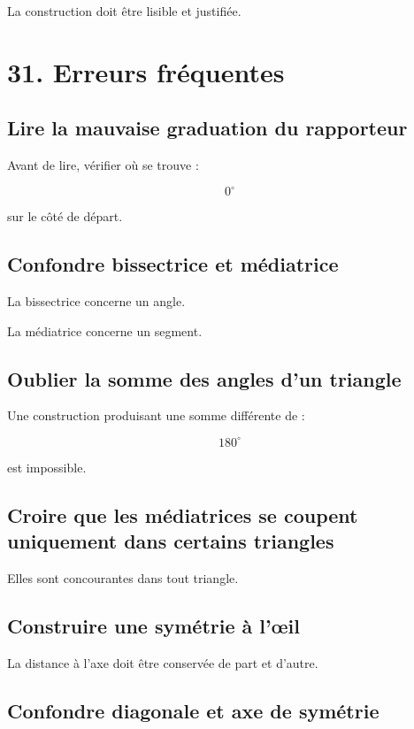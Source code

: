 La construction doit être lisible et justifiée.

\section{31. Erreurs fréquentes}

\subsection{Lire la mauvaise graduation du rapporteur}

Avant de lire, vérifier où se trouve :

\[
0^\circ
\]

sur le côté de départ.

\subsection{Confondre bissectrice et médiatrice}

La bissectrice concerne un angle.

La médiatrice concerne un segment.

\subsection{Oublier la somme des angles d’un triangle}

Une construction produisant une somme différente de :

\[
180^\circ
\]

est impossible.

\subsection{Croire que les médiatrices se coupent uniquement dans certains triangles}

Elles sont concourantes dans tout triangle.

\subsection{Construire une symétrie à l’œil}

La distance à l’axe doit être conservée de part et d’autre.

\subsection{Confondre diagonale et axe de symétrie}

